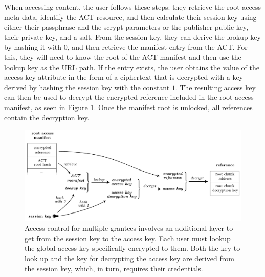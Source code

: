 When accessing content, the user follows these steps: they retrieve the root access meta data, identify the ACT resource, and then calculate their session key using either their passphrase and the scrypt parameters or the publisher public key, their private key, and a salt. From the session key, they can derive the lookup key by hashing it with $0$, and then retrieve the manifest entry from the ACT. For this, they will need to know the root of the ACT manifest and then use the lookup key as the URL path. If the entry exists, the user obtains the value of the access key attribute in the form of a ciphertext that is decrypted with a key derived by hashing the session key with the constant $1$. The resulting access key can then be used to decrypt the encrypted reference included in the root access manifest, as seen in Figure \ref{fig:access-control-multiple-party}. Once the manifest root is unlocked, all references contain the decryption key.

\begin{figure}[htbp]
\centering
\includegraphics[width=\textwidth]{fig/access-control-multiple-party.pdf}
\caption[Access control for multiple grantees \statusyellow]{Access control for multiple grantees involves an additional layer to get from the session key to the access key. Each user must lookup the global access key specifically encrypted to them. Both the key to look up and the key for decrypting the access key are derived from the session key, which, in turn, requires their credentials.} 
\label{fig:access-control-multiple-party}
\end{figure}


